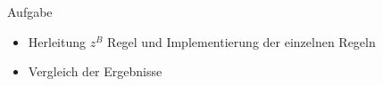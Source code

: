 \begin{frame}{Aufgabe}
\begin{itemize}
\item Herleitung $z^B$ Regel und Implementierung der einzelnen Regeln
\item Vergleich der Ergebnisse
\end{itemize}
\end{frame}